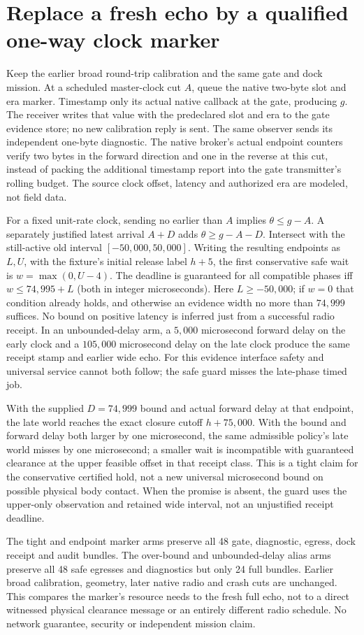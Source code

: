 \documentclass{article}
\begin{document}
\section*{Replace a fresh echo by a qualified one-way clock marker}
Keep the earlier broad round-trip calibration and the same gate
and dock mission. At a scheduled master-clock cut $A$, queue the
native two-byte slot and era marker. Timestamp only its actual
native callback at the gate, producing $g$. The receiver writes that
value with the predeclared slot and era to the gate evidence store;
no new calibration reply is sent. The same observer sends its
independent one-byte diagnostic. The native broker's actual endpoint
counters verify two bytes in the forward direction and one in the
reverse at this cut, instead of packing the additional timestamp
report into the gate transmitter's rolling budget. The source clock
offset, latency and authorized era are modeled, not field data.

For a fixed unit-rate clock, sending no earlier than $A$ implies
$\theta\le g-A$. A separately justified latest arrival $A+D$
adds $\theta\ge g-A-D$. Intersect with the still-active
old interval $[-50,000,50,000]$. Writing the resulting endpoints
as $L,U$, with the fixture's initial release label $h+5$,
the first conservative safe wait is $w=\max(0,U-4)$.
The deadline is guaranteed for all compatible phases iff
$w\le74,995+L$ (both in integer microseconds). Here $L\ge-50,000$;
if $w=0$ that condition already holds, and otherwise an evidence
width no more than $74,999$ suffices. No bound on positive
latency is inferred just from a successful radio receipt. In an
unbounded-delay arm, a $5,000$ microsecond forward delay on the
early clock and a $105,000$ microsecond delay on the late clock
produce the same receipt stamp and earlier wide echo. For this
evidence interface safety and universal service cannot both follow;
the safe guard misses the late-phase timed job.

With the supplied $D=74,999$ bound and actual forward delay at
that endpoint, the late world reaches the exact closure cutoff
$h+75,000$. With the bound and forward delay both larger by one
microsecond, the same admissible policy's late world misses by
one microsecond; a smaller wait is incompatible with guaranteed
clearance at the upper feasible offset in that receipt class.
This is a tight claim for the conservative certified hold, not a
new universal microsecond bound on possible physical body contact.
When the promise is absent, the guard uses the upper-only
observation and retained wide interval, not an unjustified receipt
deadline.

The tight and endpoint marker arms preserve all 48 gate, diagnostic,
egress, dock receipt and audit bundles. The over-bound and
unbounded-delay alias arms preserve all 48 safe egresses and
diagnostics but only 24 full bundles. Earlier broad calibration,
geometry, later native radio and crash cuts are unchanged.
This compares the marker's resource needs to the fresh full echo,
not to a direct witnessed physical clearance message or an entirely
different radio schedule. No network guarantee, security or
independent mission claim.
\end{document}

